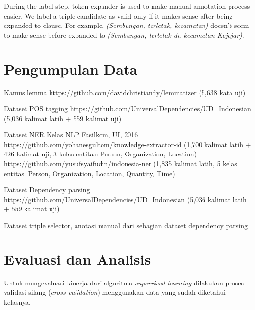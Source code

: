 During the label step, token expander is used to make manual annotation process easier. We label a triple candidate as valid only if it makes sense after being expanded to clause. For example, \textit{(Sembungan, terletak, kecamatan)} doesn't seem to make sense before expanded to \textit{(Sembungan, terletak di, kecamatan Kejajar)}.

\section{Pengumpulan Data}


Kamus lemma \url{https://github.com/davidchristiandy/lemmatizer} (5,638 kata uji)

Dataset POS tagging \url{https://github.com/UniversalDependencies/UD_Indonesian} (5,036 kalimat latih + 559 kalimat uji)

Dataset NER Kelas NLP Fasilkom, UI, 2016 \url{https://github.com/yohanesgultom/knowledge-extractor-id} (1,700 kalimat latih  + 426 kalimat uji, 3 kelas entitas: Person, Organization, Location) \url{https://github.com/yusufsyaifudin/indonesia-ner} (1,835 kalimat latih, 5 kelas entitas: Person, Organization, Location, Quantity, Time)

Dataset Dependency parsing \url{https://github.com/UniversalDependencies/UD_Indonesian} (5,036 kalimat latih + 559 kalimat uji)

Dataset triple selector, anotasi manual dari sebagian dataset dependency parsing

\section{Evaluasi dan Analisis}

Untuk mengevaluasi kinerja dari algoritma \textit{supervised learning} dilakukan proses validasi silang (\textit{cross validation}) menggunakan data yang sudah diketahui kelasnya.